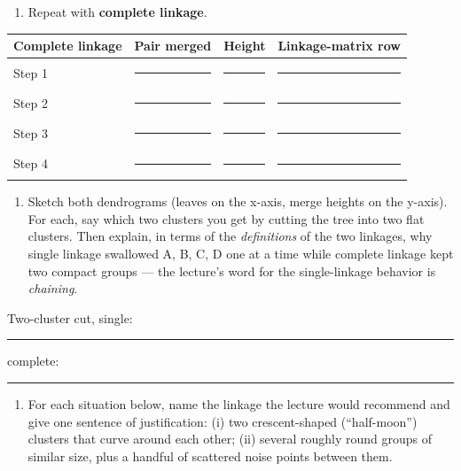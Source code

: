 \documentclass[
  11pt,
]{article}
\providecommand{\tightlist}{%
  \setlength{\itemsep}{0pt}\setlength{\parskip}{0pt}}
\newcommand{\answerspace}[1]{\par\vspace*{#1}}  %
\newcommand{\blank}[1][1.2in]{\rule{#1}{0.4pt}}
\begin{document}
\answerspace{4in}

\begin{enumerate}
\def\labelenumi{(\alph{enumi})}
\setcounter{enumi}{1}
\tightlist
\item
  Repeat with \textbf{complete linkage}.
\end{enumerate}

\begin{longtable}[]{@{}llll@{}}
\toprule\noalign{}
Complete linkage & Pair merged & Height & Linkage-matrix row \\
\midrule\noalign{}
\endhead
\bottomrule\noalign{}
\endlastfoot
Step 1 & \blank[1.2in] & \blank[0.7in] & \blank[2in] \\
Step 2 & \blank[1.2in] & \blank[0.7in] & \blank[2in] \\
Step 3 & \blank[1.2in] & \blank[0.7in] & \blank[2in] \\
Step 4 & \blank[1.2in] & \blank[0.7in] & \blank[2in] \\
\end{longtable}

\answerspace{3.2in}

\begin{enumerate}
\def\labelenumi{(\alph{enumi})}
\setcounter{enumi}{2}
\tightlist
\item
  Sketch both dendrograms (leaves on the x-axis, merge heights on the
  y-axis). For each, say which two clusters you get by cutting the tree
  into two flat clusters. Then explain, in terms of the
  \emph{definitions} of the two linkages, why single linkage swallowed
  A, B, C, D one at a time while complete linkage kept two compact
  groups --- the lecture's word for the single-linkage behavior is
  \emph{chaining}.
\end{enumerate}

\answerspace{3.4in}

Two-cluster cut, single: \blank[2in] \qquad complete: \blank[2in]

\answerspace{1.4in}

\begin{enumerate}
\def\labelenumi{(\alph{enumi})}
\setcounter{enumi}{3}
\tightlist
\item
  For each situation below, name the linkage the lecture would recommend
  and give one sentence of justification: (i) two crescent-shaped
  (``half-moon'') clusters that curve around each other; (ii) several
  roughly round groups of similar size, plus a handful of scattered
  noise points between them.
\end{enumerate}
\end{document}
